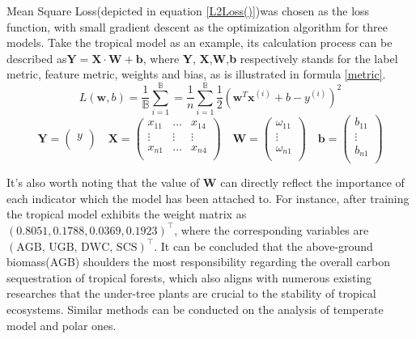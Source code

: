 \documentclass[12pt]{article}
\begin{document}
Mean Square Loss(depicted in equation \ref{L2Loss()})was chosen as the loss function, with small gradient descent as the optimization algorithm for three models. Take the tropical model as an example, its calculation process can be described as$\textbf{Y} = \textbf{X}\cdot\textbf{W} + \textbf{b}$, where \textbf{Y}, \textbf{X},\textbf{W},\textbf{b} respectively stands for the label metric, feature metric, weights and bias, as is illustrated in formula \ref{metric}. 
\begin{equation}
	L(\textbf{w},b)=\frac{1}{\mathbb{B}}\sum_{i=1}^{\mathbb{B}}=\frac{1}{n}\sum_{i=1}^{\mathbb{B}}\frac{1}{2}(\textbf{w}^T\textbf{x}^{(i)}+b-y^{(i)})^2
	\label{L2Loss()}
\end{equation}
\begin{equation}
	\textbf{Y}=\begin{pmatrix}
		y \\
	\end{pmatrix}
	\quad
	\textbf{X}=\begin{pmatrix}
	x_{11} & \dots & x_{14} \\
	\vdots & \vdots & \vdots \\
	x_{n1} & \dots & x_{n4} \\
\end{pmatrix}
	\quad
		\textbf{W}=\begin{pmatrix}
		\omega_{11}\\
		\vdots \\
		\omega_{n1} \\
	\end{pmatrix}
		\quad
	\textbf{b}=\begin{pmatrix}
		b_{11}\\
		\vdots \\
		b_{n1} \\
	\end{pmatrix}
	\label{metric}
\end{equation}

It's also worth noting that the value of $\textbf{W}$ can directly reflect the importance of each indicator which the model has been attached to. For instance, after training the tropical model exhibits the weight matrix as $(0.8051, 0.1788, 0.0369, 0.1923)^{\top}$, where the corresponding variables are $(\text{AGB, UGB, DWC, SCS})^{\top}$. It can be concluded that the above-ground biomass(AGB) shoulders the most responsibility regarding the overall carbon sequestration of tropical forests, which also aligns with numerous existing researches that the under-tree plants are crucial to the stability of tropical ecosystems. Similar methods can be conducted on the analysis of temperate model and polar ones.
\end{document}

